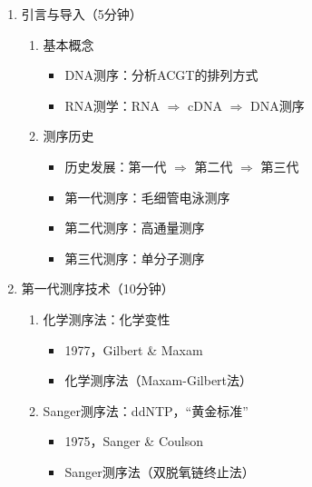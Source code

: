 \documentclass{TIJMUjiaoanLL}
\begin{document}
\begin{enumerate}
  \item 引言与导入（5分钟）
    \begin{enumerate}
      \item 基本概念
        \begin{itemize}
          \item DNA测序：分析ACGT的排列方式
          \item RNA测学：RNA $\Rightarrow$ cDNA $\Rightarrow$ DNA测序
        \end{itemize}
      \item 测序历史
        \begin{itemize}
          \item 历史发展：第一代 $\Rightarrow$ 第二代 $\Rightarrow$ 第三代
          \item 第一代测序：毛细管电泳测序
          \item 第二代测序：高通量测序
          \item 第三代测序：单分子测序
        \end{itemize}
    \end{enumerate}

  \item 第一代测序技术（10分钟）
    \begin{enumerate}
      \item 化学测序法：化学变性
        \begin{itemize}
          \item 1977，Gilbert \& Maxam
          \item 化学测序法（Maxam-Gilbert法）
        \end{itemize}
      \item Sanger测序法：ddNTP，“黄金标准”
        \begin{itemize}
          \item 1975，Sanger \& Coulson
          \item Sanger测序法（双脱氧链终止法）
        \end{itemize}
    \end{enumerate}


\end{enumerate}
\end{document}
